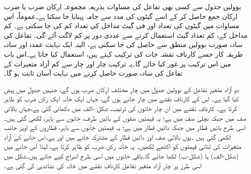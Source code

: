 بوولین جدول سے کسی بھی تفاعل کی مساوات بذریعہ مجموعہ ارکان ضرب یا ضرب ارکان جمع حاصل کر کے اسے گیٹوں کی مدد سے جامہ پہنایا جا سکتا ہے۔عموماً،   اس مساوات میں  گیٹوں کی تعداد اور فی گیٹ مداخل کی تعداد کم کی جا سکتی ہے۔ کم مداخل کے،  کم تعداد  گیٹ استعمال کرنے سے    عددی دور پر کم   لاگت آئے گی۔ تفاعل کی سادہ  صورت  بوولین منطق سے حاصل کی جا سکتی ہے، البتہ ایک نہایت عمدہ اور سادہ طریقہ کار جسے کارناف نقشہ جات  کی ترکیب  کہتے ہیں،  استعمال کیا جاتا ہے۔اس باب میں اس ترکیب  پر غور  کیا جائے گا۔یہ  ترکیب  چار اور چار سے کم آزاد متغیرات کے تفاعل کی سادہ  صورت  حاصل کرنے میں  نہایت آسان ثابت ہو گا۔

دو آزاد متغیر  تفاعل   کے بوولین جدول میں چار مختلف ارکان ضرب  ہوں گے،  جنہیں   جدول    میں پیش کیا  گیا ہے۔ اس کے کارناف نقشے میں چار خانے ہوں گے، جہاں ایک خانہ ایک رکن ضرب کو ظاہر کرتا ہے۔ کارناف نقشے میں ان چار خانوں کی ترتیب، شکل  -الف  میں دکھائی گئی ہے،جہاں بالائی  صف  میں    جبکہ نچلی صف  میں   ہے؛  یہ قیمتیں  صفوں کے بائیں طرف، خانوں سے باہر،   لکھی  گئی ہیں۔اسی طرح بائیں قطار  میں   جبکہ دائیں قطار  میں  ہے؛ یہ قیمتیں  خانوں سے باہر،  قطاروں کے  اوپر   جانب لکھی  گئی ہیں ۔یوں   بالائی  صف اور دائیں قطار  کے مشترکہ خانے   میں   اور  ہے۔اس خانے کے آزاد متغیرات کی ثنائی قیمتوں  کو اکٹھے    لکھیں۔ یہ خانہ رکن ضرب  کو ظاہر کرتا ہے، لہٰذا  اس خانے میں  (شکل-الف)  یا    (شکل-ب) لکھا جائے گا۔باقی  خانوں میں اسی طرح اندراج کیے جاتے ہیں۔شکل  میں اسی طرز پر چار آزاد متغیر  تفاعل  کارناف نقشے میں خانہ   کی نشاندہی کی گئی ہے۔

